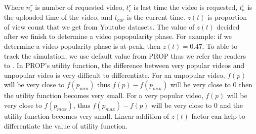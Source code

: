 \documentclass[10pt,final,journal,a4paper]{IEEEtran}
\begin{document}
Where $n_i^r$ is number of requested video, $t_i^r$ is last time the video is requested, $t_a^i$ is the uploaded time of the video, and $t_{cur}$ is the current time.
$z(t)$ is proportion of view count that we get from Youtube datasets.  
The value of $z(t)$ decided after we finish to determine a video popopularity phase.  
For example: if we determine a video popularity phase is at-peak, then $z(t)=0.47$.
To able to track the simulation, we use default value from PROP thus we refer the readers to \cite{1613869}.
In PROP's utility function, the difference between very popular videos and unpopular video is very difficult to differentiate. 
For an unpopular video, $f(p)$ will be very close to $f(p_{min})$ thus $f(p) - f(p_{min})$ will be very close to $0$ then the utility function becomes very small.
For a very popular video, $f(p)$ will be very close to $f(p_{max})$, thus $f(p_{max}) - f(p)$ will be very close to $0$ and the  utility function becomes very small.  
Linear addition of $z(t)$ factor can help to differentiate the value of utility function.
\end{document}
